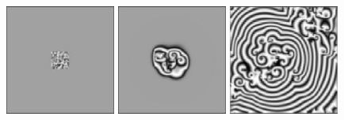 \begin{frame}[fragile]
\centerline{\includegraphics[draft=false,width=0.27\textwidth]{phase_lattice_2d_0000.jpg} \hspace{2ex}
\includegraphics[draft=false,width=0.27\textwidth]{phase_lattice_2d_0100.jpg} \hspace{2ex}
\includegraphics[draft=false,width=0.27\textwidth]{phase_lattice_2d_1000.jpg}}
\end{frame}

